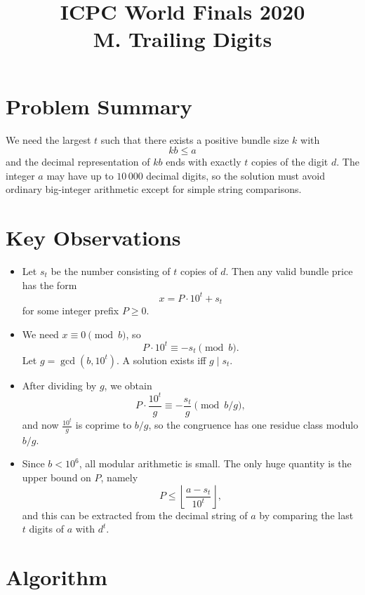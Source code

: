 \documentclass[11pt]{article}
\title{ICPC World Finals 2020\\M. Trailing Digits}
\author{}
\date{}
\begin{document}
\maketitle

\section*{Problem Summary}

We need the largest $t$ such that there exists a positive bundle size $k$ with
\[
    kb \le a
\]
and the decimal representation of $kb$ ends with exactly $t$ copies of the digit $d$.
The integer $a$ may have up to $10\,000$ decimal digits, so the solution must avoid ordinary big-integer
arithmetic except for simple string comparisons.

\section*{Key Observations}

\begin{itemize}[leftmargin=*]
    \item Let $s_t$ be the number consisting of $t$ copies of $d$. Then any valid bundle price has the form
    \[
        x = P \cdot 10^t + s_t
    \]
    for some integer prefix $P \ge 0$.
    \item We need $x \equiv 0 \pmod b$, so
    \[
        P \cdot 10^t \equiv -s_t \pmod b.
    \]
    Let $g = \gcd(b, 10^t)$. A solution exists iff $g \mid s_t$.
    \item After dividing by $g$, we obtain
    \[
        P \cdot \frac{10^t}{g} \equiv -\frac{s_t}{g} \pmod{b/g},
    \]
    and now $\frac{10^t}{g}$ is coprime to $b/g$, so the congruence has one residue class modulo $b/g$.
    \item Since $b < 10^6$, all modular arithmetic is small. The only huge quantity is the upper bound on
    $P$, namely
    \[
        P \le \left\lfloor \frac{a - s_t}{10^t} \right\rfloor,
    \]
    and this can be extracted from the decimal string of $a$ by comparing the last $t$ digits of $a$ with
    $d^t$.
\end{itemize}

\section*{Algorithm}
\end{document}

